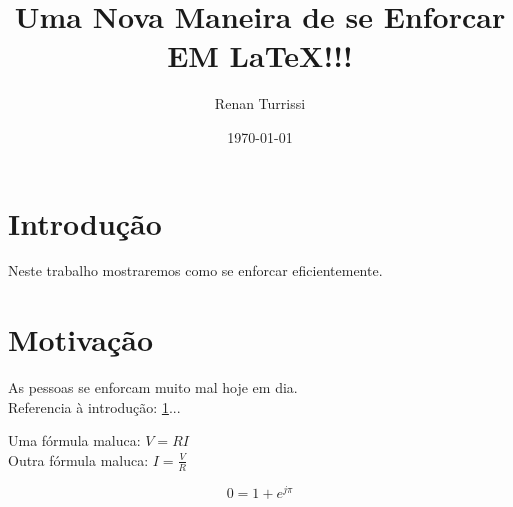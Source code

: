 \documentclass{article}
\author{Renan Turrissi}
\date{\today}
\title{Uma Nova Maneira de se Enforcar EM \LaTeX !!!}
\begin{document}
\maketitle

\newpage

\section{Introdução}\label{sec:intro}
Neste trabalho mostraremos como se enforcar eficientemente.

\section{Motivação}\label{sec:motiv}
As pessoas se enforcam muito mal hoje em dia.\\
Referencia à introdução: \ref{sec:intro}...

Uma fórmula maluca: $ V =RI $ \\
Outra fórmula maluca: $ I = \frac{V}{R} $

$$ 0 = 1+e^{j\pi}  $$
\end{document}
